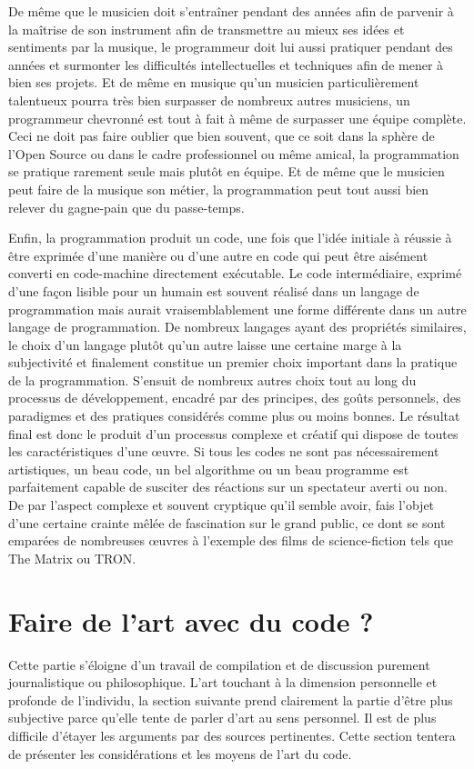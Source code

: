 \documentclass[12pt]{article} %
\begin{document}
De même que le musicien doit s'entraîner pendant des années afin de parvenir à la maîtrise de son instrument afin de transmettre au mieux ses idées et sentiments par la musique, le programmeur doit lui aussi pratiquer pendant des années et surmonter les difficultés intellectuelles et techniques afin de mener à bien ses projets. Et de même en musique qu'un musicien particulièrement talentueux pourra très bien surpasser de nombreux autres musiciens, un programmeur chevronné est tout à fait à même de surpasser une équipe complète. Ceci ne doit pas faire oublier que bien souvent, que ce soit dans la sphère de l'Open Source ou dans le cadre professionnel ou même amical, la programmation se pratique rarement seule mais plutôt en équipe. Et de même que le musicien peut faire de la musique son métier, la programmation peut tout aussi bien relever du gagne-pain que du passe-temps. 

Enfin, la programmation produit un code, une fois que l'idée initiale à réussie à être exprimée d'une manière ou d'une autre en code qui peut être aisément converti en code-machine directement exécutable. Le code intermédiaire, exprimé d'une façon lisible pour un humain est souvent réalisé dans un langage de programmation mais aurait vraisemblablement une forme différente dans un autre langage de programmation. De nombreux langages ayant des propriétés similaires, le choix d'un langage plutôt qu'un autre laisse une certaine marge à la subjectivité et finalement constitue un premier choix important dans la pratique de la programmation. S'ensuit de nombreux autres choix tout au long du processus de développement, encadré par des principes, des goûts personnels, des paradigmes et des pratiques considérés comme plus ou moins bonnes. Le résultat final est donc le produit d'un processus complexe et créatif qui dispose de toutes les caractéristiques d'une œuvre. Si tous les codes ne sont pas nécessairement artistiques, un beau code, un bel algorithme ou un beau programme est parfaitement capable de susciter des réactions sur un spectateur averti ou non. De par l'aspect complexe et souvent cryptique qu'il semble avoir, fais l'objet d'une certaine crainte mêlée de fascination sur le grand public, ce dont se sont emparées de nombreuses œuvres à l'exemple des films de science-fiction tels que The Matrix ou TRON.

\section{Faire de l'art avec du code ?}
Cette partie s'éloigne d'un travail de compilation et de discussion purement journalistique ou philosophique. L'art touchant à la dimension personnelle et profonde de l'individu, la section suivante prend clairement la partie d'être plus subjective parce qu'elle tente de parler d'art au sens personnel. Il est de plus difficile d'étayer les arguments par des sources pertinentes. Cette section tentera de présenter les considérations et les moyens de l'art du code. 
\end{document}
